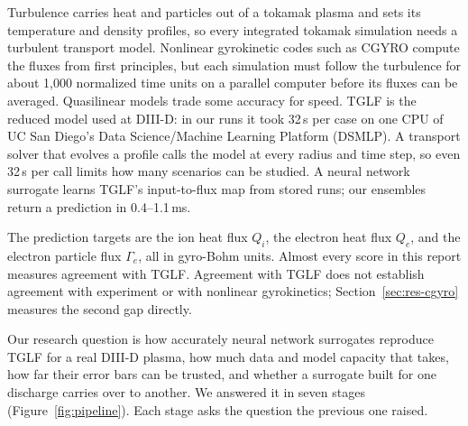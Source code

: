 \documentclass[12pt,letterpaper]{article}
\begin{document}
Turbulence carries heat and particles out of a tokamak plasma and sets its temperature and
density profiles, so every integrated tokamak simulation needs a turbulent transport model.
Nonlinear gyrokinetic codes such as CGYRO \citep{candy2016} compute the fluxes from first
principles, but each simulation must follow the turbulence for about 1,000 normalized time
units on a parallel computer before its fluxes can be averaged. Quasilinear models trade some accuracy for speed. TGLF
\citep{staebler2007} is the reduced model used at DIII-D: in our runs it took 32\,s per case
on one CPU of UC San Diego's Data Science/Machine Learning Platform (DSMLP). A transport
solver that evolves a profile calls the model at every radius and time step, so even 32\,s
per call limits how many scenarios can be studied. A neural network surrogate learns TGLF's
input-to-flux map from stored runs; our ensembles return a prediction in 0.4--1.1\,ms.

The prediction targets are the ion heat flux $Q_i$, the electron heat flux $Q_e$, and the
electron particle flux $\Gamma_e$, all in gyro-Bohm units. Almost every score in this report
measures agreement with TGLF. Agreement with TGLF does not establish agreement with
experiment or with nonlinear gyrokinetics; Section~\ref{sec:res-cgyro} measures the second
gap directly.

Our research question is how accurately neural network surrogates reproduce TGLF for a real
DIII-D plasma, how much data and model capacity that takes, how far their error bars can be
trusted, and whether a surrogate built for one discharge carries over to another. We
answered it in seven stages (Figure~\ref{fig:pipeline}). Each stage asks the question the
previous one raised.
\end{document}

